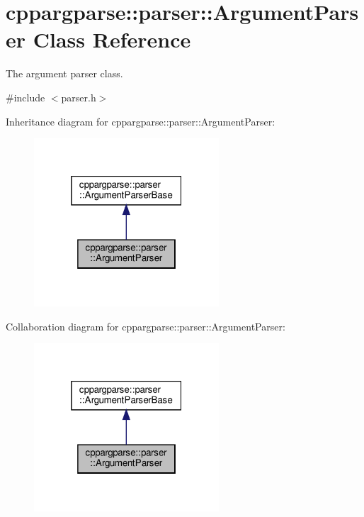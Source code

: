 \hypertarget{classcppargparse_1_1parser_1_1ArgumentParser}{}\section{cppargparse\+:\+:parser\+:\+:Argument\+Parser Class Reference}
\label{classcppargparse_1_1parser_1_1ArgumentParser}


The argument parser class.  




{\ttfamily \#include $<$parser.\+h$>$}



Inheritance diagram for cppargparse\+:\+:parser\+:\+:Argument\+Parser\+:
\nopagebreak
\begin{figure}[H]
\begin{center}
\leavevmode
\includegraphics[width=196pt]{classcppargparse_1_1parser_1_1ArgumentParser__inherit__graph}
\end{center}
\end{figure}


Collaboration diagram for cppargparse\+:\+:parser\+:\+:Argument\+Parser\+:
\nopagebreak
\begin{figure}[H]
\begin{center}
\leavevmode
\includegraphics[width=196pt]{classcppargparse_1_1parser_1_1ArgumentParser__coll__graph}
\end{center}
\end{figure}
